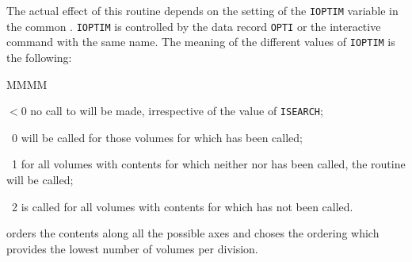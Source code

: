 The actual effect of this routine depends on the setting of the {\tt IOPTIM}
variable in the common . {\tt IOPTIM} is controlled by the
data record {\tt OPTI} or the interactive command with the same name.
The meaning of the different values of {\tt IOPTIM} is the following:
\begin{DLtt}{MMMM}
\item[$<$0] no call to  will be made, irrespective of the
value of {\tt ISEARCH};
\item[~0]  will be called for those volumes for which 
has been called;
\item[~1] for all volumes with contents for which neither  nor
 has been called, the routine  will be called;
\item[~2]  is called for all volumes with contents
for which  has not been called.
\end{DLtt}
 
 orders the contents along all the possible axes and choses the
ordering which provides the lowest number of volumes per division.
